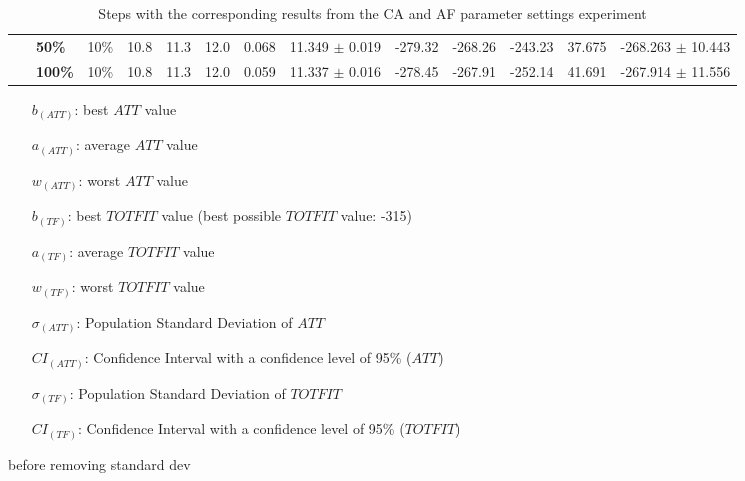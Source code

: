 \begin{sidewaystable}
\begin{tabular}{|l|l|l||c|c|c|c|c|c|c|c|c|c|}
    ~ & \textbf{50\%} & 10\% & 10.8 & 11.3 & 12.0 & 0.068 & 11.349 $\pm$ 0.019 & -279.32 & -268.26 & -243.23 & 37.675 & -268.263 $\pm$ 10.443 \\
    ~ & \textbf{100\%} & 10\% & 10.8 & 11.3 & 12.0 & 0.059 & 11.337 $\pm$ 0.016 & -278.45 & -267.91 & -252.14 & 41.691 & -267.914 $\pm$ 11.556 \\
    \hline
    \end{tabular}
    \caption {Steps with the corresponding results from the CA and AF parameter settings experiment}
    \tiny
    \begin{itemize}[noitemsep]
    \item[$b_{(ATT)}$:] best $ATT$ value
    \item[$a_{(ATT)}$:] average $ATT$ value
    \item[$w_{(ATT)}$:] worst $ATT$ value
    \item[$b_{(TF)}$:] best $TOTFIT$ value (best possible $TOTFIT$ value: -315)
    \item[$a_{(TF)}$:] average $TOTFIT$ value
    \item[$w_{(TF)}$:] worst $TOTFIT$ value
    \item[$\sigma_{(ATT)}$:] Population Standard Deviation of $ATT$
    \item[$CI_{(ATT)}$:] Confidence Interval with a confidence level of 95\% ($ATT$)
    \item[$\sigma_{(TF)}$:] Population Standard Deviation of $TOTFIT$
    \item[$CI_{(TF)}$:] Confidence Interval with a confidence level of 95\% ($TOTFIT$)
    \end{itemize}
    \label{table:pm2}
\end{sidewaystable}


before removing standard dev

